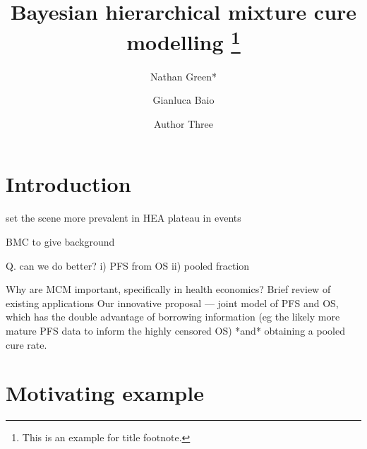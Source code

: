 \documentclass[AMA,STIX1COL]{WileyNJD-v2}
\begin{document}
\title{Bayesian hierarchical mixture cure modelling \protect\thanks{This is an example for title footnote.}}

\author[1]{Nathan Green*}

\author[2,3]{Gianluca Baio}

\author[3]{Author Three}


\address[1]{, , }

\address[2]{, , }

\address[3]{, , }


\presentaddress{}

\abstract[Summary]{}



\maketitle



\section{Introduction}\label{sec1}

set the scene
more prevalent in HEA
plateau in events

BMC to give background

Q. can we do better?
i) PFS from OS
ii) pooled fraction

Why are MCM important, specifically in health economics?
Brief review of existing applications
Our innovative proposal --- joint model of PFS and OS, which has the double advantage of borrowing information (eg the likely more mature PFS data to inform the highly censored OS) *and* obtaining a pooled cure rate.


\section{Motivating example}\label{sec5}
\end{document}
